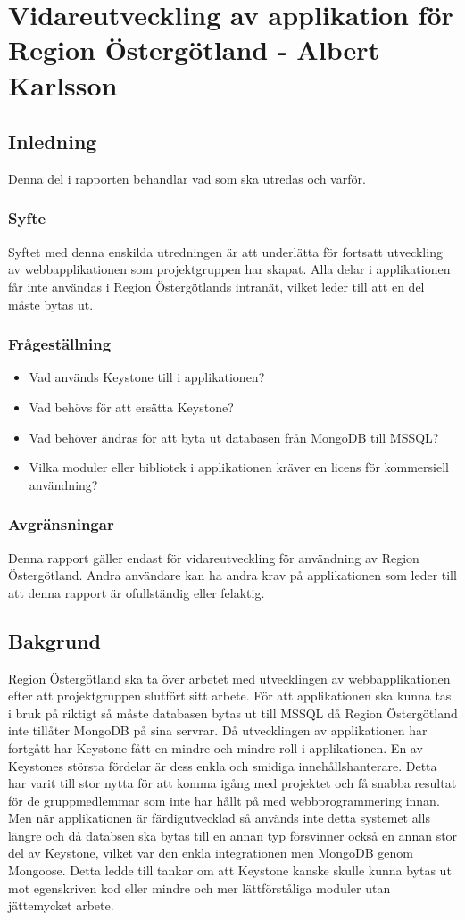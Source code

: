 \section{Vidareutveckling av applikation för Region Östergötland - Albert Karlsson}
\subsection{Inledning}
Denna del i rapporten behandlar vad som ska utredas och varför.
\subsubsection{Syfte}
Syftet med denna enskilda utredningen är att underlätta för fortsatt utveckling av webbapplikationen som projektgruppen har skapat. Alla delar i applikationen får inte användas i Region Östergötlands intranät, vilket leder till att en del måste bytas ut.
\subsubsection{Frågeställning}
\begin{itemize}
\item Vad används Keystone till i applikationen?
\item Vad behövs för att ersätta Keystone?
\item Vad behöver ändras för att byta ut databasen från MongoDB till MSSQL?
\item Vilka moduler eller bibliotek i applikationen kräver en licens för kommersiell användning?

\end{itemize}
\subsubsection{Avgränsningar}
Denna rapport gäller endast för vidareutveckling för användning av Region Östergötland. Andra användare kan ha andra krav på applikationen som leder till att denna rapport är ofullständig eller felaktig. 
\subsection{Bakgrund}
Region Östergötland ska ta över arbetet med utvecklingen av webbapplikationen efter att projektgruppen slutfört sitt arbete. För att applikationen ska kunna tas i bruk på riktigt så måste databasen bytas ut till MSSQL då Region Östergötland inte tillåter MongoDB på sina servrar. Då utvecklingen av applikationen har fortgått har Keystone fått en mindre och mindre roll i applikationen. En av Keystones största fördelar är dess enkla och smidiga innehållshanterare. Detta har varit till stor nytta för att komma igång med projektet och få snabba resultat för de gruppmedlemmar som inte har hållt på med webbprogrammering innan. Men när applikationen är färdigutvecklad så används inte detta systemet alls längre och då databsen ska bytas till en annan typ försvinner också en annan stor del av Keystone, vilket var den enkla integrationen men MongoDB genom Mongoose. Detta ledde till tankar om att Keystone kanske skulle kunna bytas ut mot egenskriven kod eller mindre och mer lättförståliga moduler utan jättemycket arbete.
